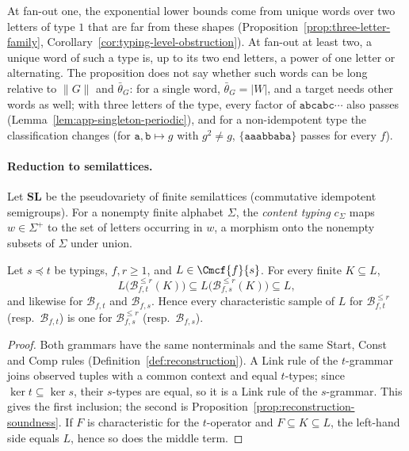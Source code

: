 At fan-out one, the exponential lower bounds come from unique words over two
letters of type $1$ that are far from these shapes
(Proposition~\ref{prop:three-letter-family}, Corollary~\ref{cor:typing-level-obstruction}).
At fan-out at least two, a unique word of such a type is, up to its two end
letters, a power of one letter or alternating.  The proposition does not say
whether such words can be long relative to $\|G\|$ and $\bar\theta_G$: for a
single word, $\bar\theta_G=|W|$, and a target needs other words as well; with
three letters of the type, every factor of $\mathtt{abcabc}\cdots$ also passes
(Lemma~\ref{lem:app-singleton-periodic}),
and for a non-idempotent type the classification changes (for
$\mathtt a,\mathtt b\mapsto g$ with $g^2\ne g$, $\{\mathtt{aaabbaba}\}$ passes for
every $f$).

\paragraph{Reduction to semilattices.}
Let $\mathbf{SL}$ be the pseudovariety of finite semilattices (commutative
idempotent semigroups).  For a nonempty finite alphabet $\Sigma$, the
\emph{content typing} $c_\Sigma$ maps $w\in\Sigma^+$ to the set of letters
occurring in $w$, a morphism onto the nonempty subsets of $\Sigma$ under union.

\begin{lemma}
\label{lem:typing-monotone}
Let $s\preceq t$ be typings, $f,r\ge1$, and $L\in\Cmcf{f}{s}$.  For every
finite $K\subseteq L$,
\[
 L\bigl(\mathcal B^{\le r}_{f,t}(K)\bigr)\subseteq
 L\bigl(\mathcal B^{\le r}_{f,s}(K)\bigr)\subseteq L,
\]
and likewise for $\mathcal B_{f,t}$ and $\mathcal B_{f,s}$.  Hence every
characteristic sample of $L$ for $\mathcal B^{\le r}_{f,t}$ (resp.\
$\mathcal B_{f,t}$) is one for $\mathcal B^{\le r}_{f,s}$ (resp.\
$\mathcal B_{f,s}$).
\end{lemma}

\begin{proof}
Both grammars have the same nonterminals and the same Start, Const and Comp
rules (Definition~\ref{def:reconstruction}).  A Link rule of the $t$-grammar
joins observed tuples with a common context and equal $t$-types; since
$\ker t\subseteq\ker s$, their $s$-types are equal, so it is a Link rule of the
$s$-grammar.  This gives the first inclusion; the second is
Proposition~\ref{prop:reconstruction-soundness}.  If $F$ is characteristic for
the $t$-operator and $F\subseteq K\subseteq L$, the left-hand side equals $L$,
hence so does the middle term.
\end{proof}

